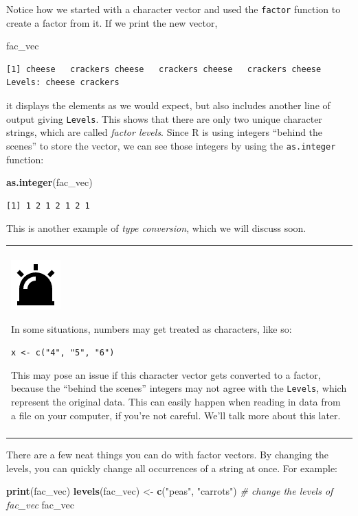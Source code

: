 \documentclass[
]{book}
\newenvironment{Shaded}{\begin{snugshade}}{\end{snugshade}}
\newcommand{\CommentTok}[1]{\textcolor[rgb]{0.56,0.35,0.01}{\textit{#1}}}
\newcommand{\KeywordTok}[1]{\textcolor[rgb]{0.13,0.29,0.53}{\textbf{#1}}}
\newcommand{\NormalTok}[1]{#1}
\newcommand{\StringTok}[1]{\textcolor[rgb]{0.31,0.60,0.02}{#1}}
\newenvironment{caution}
{
  \begin{center}
  \begin{tabular}{|>{\columncolor{caution}}p{0.9\textwidth}|}
  \hline\\
  \includegraphics[scale=0.1]{src/images/alarm-warning-fill.png}
}
{\\\\\hline
  \end{tabular}
  \end{center}
}
\begin{document}
Notice how we started with a character vector and used the \texttt{factor} function to create a factor from it.
If we print the new vector,

\begin{Shaded}
\begin{Highlighting}[]
\NormalTok{fac_vec}
\end{Highlighting}
\end{Shaded}

\begin{verbatim}
[1] cheese   crackers cheese   crackers cheese   crackers cheese  
Levels: cheese crackers
\end{verbatim}

it displays the elements as we would expect, but also includes another line of output giving \texttt{Levels}.
This shows that there are only two unique character strings, which are called \emph{factor levels}.
Since R is using integers ``behind the scenes'' to store the vector, we can see those integers by using the \texttt{as.integer} function:

\begin{Shaded}
\begin{Highlighting}[]
\KeywordTok{as.integer}\NormalTok{(fac_vec)}
\end{Highlighting}
\end{Shaded}

\begin{verbatim}
[1] 1 2 1 2 1 2 1
\end{verbatim}

This is another example of \emph{type conversion}, which we will discuss soon.

\begin{caution}
In some situations, numbers may get treated as characters, like so:

\texttt{x\ \textless{}-\ c("4",\ "5",\ "6")}

This may pose an issue if this character vector gets converted to a
factor, because the ``behind the scenes'' integers may not agree with
the \texttt{Levels}, which represent the original data. This can easily
happen when reading in data from a file on your computer, if you're not
careful. We'll talk more about this later.
\end{caution}

There are a few neat things you can do with factor vectors.
By changing the levels, you can quickly change all occurrences of a string at once.
For example:

\begin{Shaded}
\begin{Highlighting}[]
\KeywordTok{print}\NormalTok{(fac_vec)}
\KeywordTok{levels}\NormalTok{(fac_vec) <-}\StringTok{ }\KeywordTok{c}\NormalTok{(}\StringTok{"peas"}\NormalTok{, }\StringTok{"carrots"}\NormalTok{)   }\CommentTok{# change the levels of fac_vec}
\NormalTok{fac_vec}
\end{Highlighting}
\end{Shaded}
\end{document}
